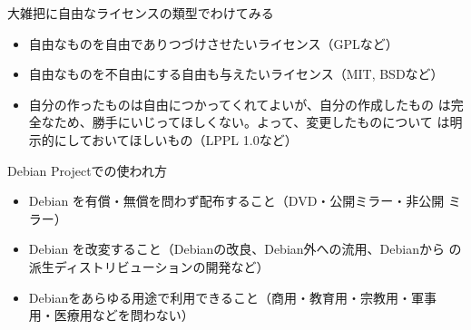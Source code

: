 \documentclass[cjk,dvipdfmx,12pt]{beamer}
\begin{document}
\begin{frame}{大雑把に自由なライセンスの類型でわけてみる}
\begin{itemize}
 \item 自由なものを自由でありつづけさせたいライセンス（GPLなど）
 \item 自由なものを不自由にする自由も与えたいライセンス（MIT, BSDなど）
 \item 自分の作ったものは自由につかってくれてよいが、自分の作成したもの
       は完全なため、勝手にいじってほしくない。よって、変更したものについて
       は明示的にしておいてほしいもの（LPPL 1.0など）
\end{itemize}
\end{frame}
\begin{frame}{Debian Projectでの使われ方}
\begin{itemize}
 \item Debian を有償・無償を問わず配布すること（DVD・公開ミラー・非公開
       ミラー）
 \item Debian を改変すること（Debianの改良、Debian外への流用、Debianから
       の派生ディストリビューションの開発など）
 \item Debianをあらゆる用途で利用できること（商用・教育用・宗教用・軍事
       用・医療用などを問わない）
\end{itemize}
\end{frame}
\end{document}
